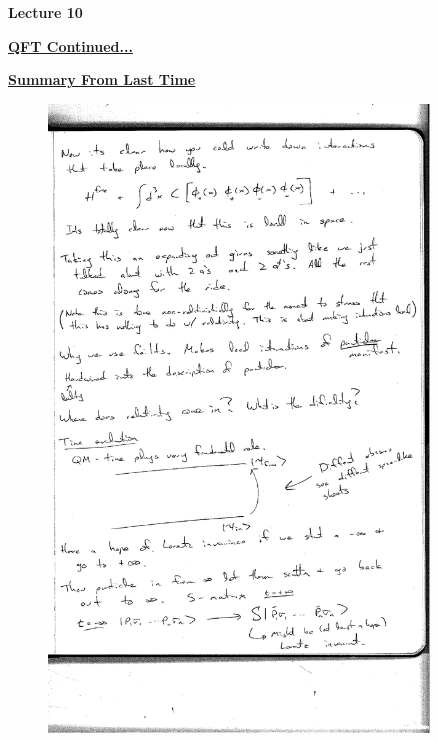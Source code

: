 \def\adagger{\ensuremath{a_{p\sigma}^\dagger}}


\usepackage{fancyhdr}

\fancyhf{}


\thispagestyle{fancy}

\begin{center}
{\huge \textbf{Lecture 10}}
\end{center}

{\fontsize{14}{16}\selectfont

\textbf{\underline{QFT Continued...}} 

{\Large \underline{\textbf{Summary From Last Time}}}


\begin{figure}[h]
\centering
\includegraphics[width=0.9\textwidth]{./TimeEvolution.pdf}
\end{figure}

}
